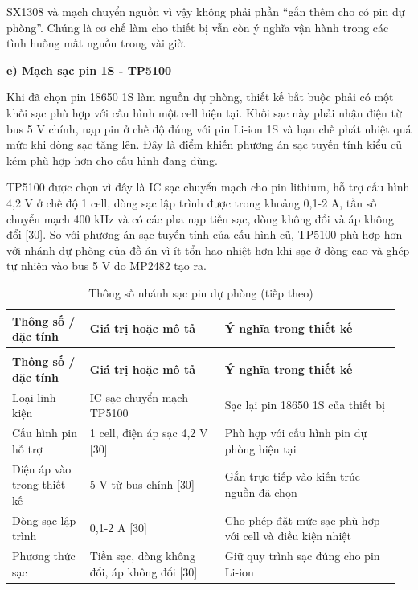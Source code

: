 \documentclass[a4paper]{extarticle}
\newcommand{\thesissettableid}[2]{%
  \renewcommand{\thetable}{#1}%
  \renewcommand{\theHtable}{#2}%
}
\begin{document}
SX1308 và mạch chuyển nguồn vì vậy không phải phần ``gắn thêm cho có pin dự phòng''.
Chúng là cơ chế làm cho thiết bị vẫn còn ý nghĩa vận hành trong các tình huống
mất nguồn trong vài giờ.

\textbf{e) Mạch sạc pin 1S - TP5100}

Khi đã chọn pin 18650 1S làm nguồn dự phòng, thiết kế bắt buộc phải có một
khối sạc phù hợp với cấu hình một cell hiện tại. Khối sạc này phải nhận điện
từ bus 5 V chính, nạp pin ở chế độ đúng với pin Li-ion 1S và hạn chế phát
nhiệt quá mức khi dòng sạc tăng lên. Đây là điểm khiến phương án sạc tuyến
tính kiểu cũ kém phù hợp hơn cho cấu hình đang dùng.

TP5100 được chọn vì đây là IC sạc chuyển mạch cho pin lithium, hỗ trợ cấu
hình 4,2 V ở chế độ 1 cell, dòng sạc lập trình được trong khoảng 0,1-2 A,
tần số chuyển mạch 400 kHz và có các pha nạp tiền sạc, dòng không đổi và
áp không đổi {[}30{]}. So với phương án sạc tuyến tính của cấu hình cũ, TP5100
phù hợp hơn với nhánh dự phòng của đồ án vì ít tổn hao nhiệt hơn khi sạc ở
dòng cao và ghép tự nhiên vào bus 5 V do MP2482 tạo ra.

{\thesissettableid{3.12E}{condensed-bang-3-12e-thong-so-nhanh-sac-pin-du-phong}
\def\LTcaptype{table}
\begin{longtable}{|L{0.199\linewidth}|L{0.33\linewidth}|L{0.43\linewidth}|}
\caption{Thông số nhánh sạc pin dự phòng}\label{tab:condensed-bang-3-12e-thong-so-nhanh-sac-pin-du-phong}\\
\hline
\textbf{Thông số / đặc tính} & \textbf{Giá trị hoặc mô tả} & \textbf{Ý nghĩa trong thiết kế} \\
\hline
\endfirsthead
\caption[]{Thông số nhánh sạc pin dự phòng (tiếp theo)}\\
\hline
\textbf{Thông số / đặc tính} & \textbf{Giá trị hoặc mô tả} & \textbf{Ý nghĩa trong thiết kế} \\
\hline
\endhead
\endfoot
\endlastfoot
Loại linh kiện & IC sạc chuyển mạch TP5100 & Sạc lại pin 18650 1S của thiết bị \\\hline
Cấu hình pin hỗ trợ & 1 cell, điện áp sạc 4,2 V {[}30{]} & Phù hợp với cấu hình pin dự phòng hiện tại \\\hline
Điện áp vào trong thiết kế & 5 V từ bus chính {[}30{]} & Gắn trực tiếp vào kiến trúc nguồn đã chọn \\\hline
Dòng sạc lập trình & 0,1-2 A {[}30{]} & Cho phép đặt mức sạc phù hợp với cell và điều kiện nhiệt \\\hline
Phương thức sạc & Tiền sạc, dòng không đổi, áp không đổi {[}30{]} & Giữ quy trình sạc đúng cho pin Li-ion \\\hline
\end{longtable}
}
\end{document}
